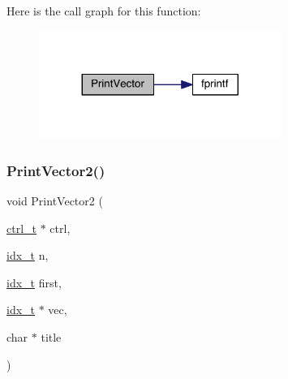 Here is the call graph for this function\+:\nopagebreak
\begin{figure}[H]
\begin{center}
\leavevmode
\includegraphics[width=224pt]{a00885_a43a186cb2cde8ebcf85b11b5c3ac0f6c_cgraph}
\end{center}
\end{figure}
\mbox{\label{a00885_aea29acc4fefc6ddc65beff73550e3593}} 
\subsubsection{\texorpdfstring{Print\+Vector2()}{PrintVector2()}}
{\footnotesize\ttfamily void Print\+Vector2 (\begin{DoxyParamCaption}\item[{\hyperlink{a00742}{ctrl\+\_\+t} $\ast$}]{ctrl,  }\item[{\hyperlink{a00876_aaa5262be3e700770163401acb0150f52}{idx\+\_\+t}}]{n,  }\item[{\hyperlink{a00876_aaa5262be3e700770163401acb0150f52}{idx\+\_\+t}}]{first,  }\item[{\hyperlink{a00876_aaa5262be3e700770163401acb0150f52}{idx\+\_\+t} $\ast$}]{vec,  }\item[{char $\ast$}]{title }\end{DoxyParamCaption})}

\mbox{\label{a00885_a980321d683a314be4d63895acec4a8fc}} 
